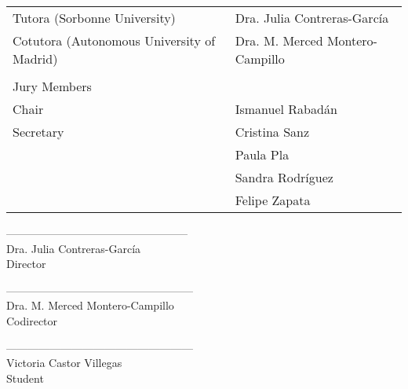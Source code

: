 \thispagestyle{empty}

\vspace{2cm}
\vspace{1cm}

\begin{tabular}{ll}
Tutora (Sorbonne University) & Dra. Julia Contreras-García\\
Cotutora (Autonomous University of Madrid) & Dra. M. Merced Montero-Campillo\\
 & \\
Jury Members & \\
Chair & Ismanuel Rabadán\\
Secretary & Cristina Sanz \\
 & Paula Pla \\
 & Sandra Rodríguez \\
 & Felipe Zapata 
\end{tabular}

\vspace{4cm}


\begin{multicols}{2}

\begin{center}
--------------------------------------------------\\
Dra. Julia Contreras-García \\
Director\\
\end{center}

\begin{center}
---------------------------------------------------\\
Dra. M. Merced Montero-Campillo\\
Codirector\\
\end{center}

\end{multicols}

\vspace{2cm}

\begin{center}
---------------------------------------------------\\
Victoria Castor Villegas\\
Student\\
\end{center}

\vspace{2cm}

